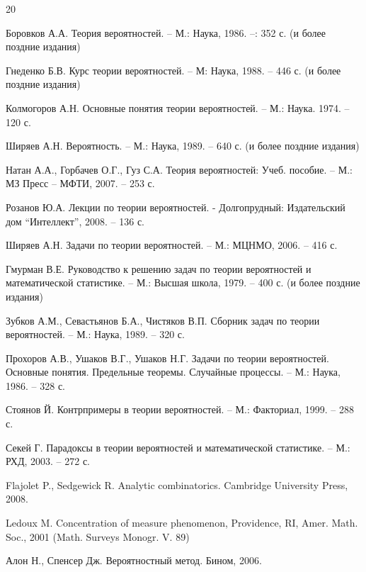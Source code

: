 \newpage

\renewcommand\refname{Литература}
\makeatletter
\renewcommand{\@biblabel}[1]{#1.}
\makeatother

\begin{thebibliography} {20}

Боровков А.А. Теория вероятностей. – М.: Наука, 1986. –: 352 с. (и более поздние издания)

Гнеденко Б.В. Курс теории вероятностей. – М: Наука, 1988. – 446 с. (и более поздние издания)

Колмогоров А.Н. Основные понятия теории вероятностей. – М.: Наука. 1974. – 120 с.

Ширяев А.Н. Вероятность. – М.: Наука, 1989. – 640 с. (и более поздние издания)

Натан А.А., Горбачев О.Г., Гуз С.А. Теория вероятностей: Учеб. пособие. – М.: МЗ Пресс – МФТИ, 2007. – 253 с.

Розанов Ю.А. Лекции по теории вероятностей. - Долгопрудный: Издательский дом “Интеллект”, 2008. – 136 с.

Ширяев А.Н. Задачи по теории вероятностей. – М.: МЦНМО, 2006. – 416 с.

Гмурман В.Е. Руководство к решению задач по теории вероятностей и математической статистике. – М.: Высшая школа, 1979. – 400 с. (и более поздние издания)

Зубков А.М., Севастьянов Б.А., Чистяков В.П. Сборник задач по теории вероятностей. – М.: Наука, 1989. – 320 с.

Прохоров А.В., Ушаков В.Г., Ушаков Н.Г. Задачи по теории вероятностей. Основные понятия. Предельные теоремы. Случайные процессы. – М.: Наука, 1986. – 328 с.

Стоянов Й. Контрпримеры в теории вероятностей. – М.: Факториал, 1999. – 288 с.

Секей Г. Парадоксы в теории вероятностей и математической статистике. – М.: РХД, 2003. – 272 с.

Flajolet P., Sedgewick R. Analytic combinatorics. Cambridge University Press, 2008. 

Ledoux M. Concentration of measure phenomenon, Providence, RI, Amer. Math. Soc., 2001 (Math. Surveys Monogr. V. 89)

Алон Н., Спенсер Дж. Вероятностный метод. Бином, 2006.


\end{thebibliography}
